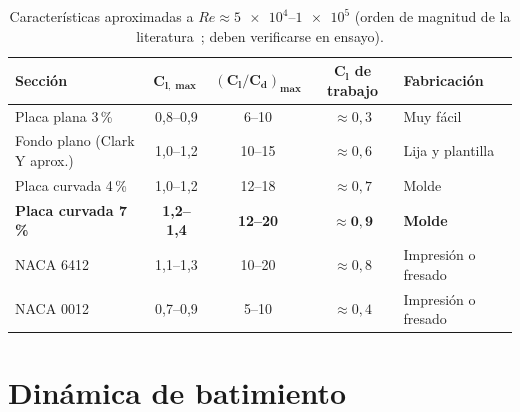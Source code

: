 \begin{table}[H]
\centering\small
\caption{Características aproximadas a $Re\approx\num{5e4}$--$\num{1e5}$ (orden de
magnitud de la literatura~\cite{pelletier2000,mueller2003,selig1995,okamoto1996}; deben
verificarse en ensayo).}\label{tab:polares}
\begin{tabular}{@{}lcccl@{}}
\toprule
\textbf{Sección} & $\boldsymbol{C_{l,\max}}$ & $\boldsymbol{(C_l/C_d)_{\max}}$ & $\boldsymbol{C_l}$ \textbf{de trabajo} & \textbf{Fabricación}\\\midrule
Placa plana 3\,\%            & 0,8--0,9 & 6--10  & $\approx0{,}3$ & Muy fácil\\
Fondo plano (Clark Y aprox.) & 1,0--1,2 & 10--15 & $\approx0{,}6$ & Lija y plantilla\\
Placa curvada 4\,\%          & 1,0--1,2 & 12--18 & $\approx0{,}7$ & Molde\\
\textbf{Placa curvada 7\,\%} & \textbf{1,2--1,4} & \textbf{12--20} & $\boldsymbol{\approx0{,}9}$ & \textbf{Molde}\\
NACA 6412                    & 1,1--1,3 & 10--20 & $\approx0{,}8$ & Impresión o fresado\\
NACA 0012                    & 0,7--0,9 & 5--10  & $\approx0{,}4$ & Impresión o fresado\\
\bottomrule
\end{tabular}
\end{table}

\section{Dinámica de batimiento}\label{sec:batimiento}

